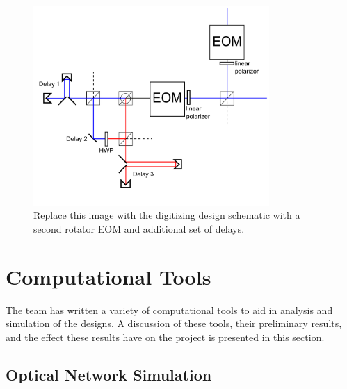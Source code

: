\documentclass[pdftex,12pt,a4paper]{article}
\begin{document}
\begin{figure}[t]
\centering
\includegraphics[width=0.8\textwidth]{digdesign1.png}
\caption{Replace this image with the digitizing design schematic with a second rotator EOM and additional set of delays.}
\label{fig:digdesigndouble}
\end{figure}

\section{Computational Tools}
\label{sec:results}
The team has written a variety of computational tools to aid in analysis and simulation of the designs. A discussion of these tools, their preliminary results, and the effect these results have on the project is presented in this section.

\subsection{Optical Network Simulation}
\label{simulation}
\end{document}
